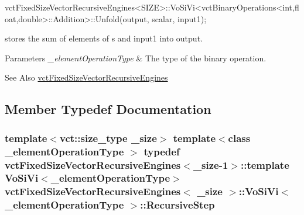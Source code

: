 \begin{DoxyPre}vctFixedSizeVectorRecursiveEngines<SIZE>::VoSiVi<vctBinaryOperations<int,float,double>::Addition>::Unfold(output, scalar, input1);
\end{DoxyPre}
 stores the sum of elements of s and input1 into output.


\begin{DoxyParams}{Parameters}
{\em \-\_\-element\-Operation\-Type} & The type of the binary operation.\\
\hline
\end{DoxyParams}
\begin{DoxySeeAlso}{See Also}
\hyperlink{classvct_fixed_size_vector_recursive_engines}{vct\-Fixed\-Size\-Vector\-Recursive\-Engines} 
\end{DoxySeeAlso}


\subsection{Member Typedef Documentation}
\hypertarget{classvct_fixed_size_vector_recursive_engines_1_1_vo_si_vi_a2a5c575fa0857d0d6c13610f43c9302d}{
\subsubsection[{Recursive\-Step}]{\setlength{\rightskip}{0pt plus 5cm}template$<$vct\-::size\-\_\-type \-\_\-size$>$ template$<$class \-\_\-element\-Operation\-Type $>$ typedef {\bf vct\-Fixed\-Size\-Vector\-Recursive\-Engines}$<$\-\_\-size-\/1$>$\-::template {\bf Vo\-Si\-Vi}$<$\-\_\-element\-Operation\-Type$>$ {\bf vct\-Fixed\-Size\-Vector\-Recursive\-Engines}$<$ \-\_\-size $>$\-::{\bf Vo\-Si\-Vi}$<$ \-\_\-element\-Operation\-Type $>$\-::{\bf Recursive\-Step}}}\label{classvct_fixed_size_vector_recursive_engines_1_1_vo_si_vi_a2a5c575fa0857d0d6c13610f43c9302d}



